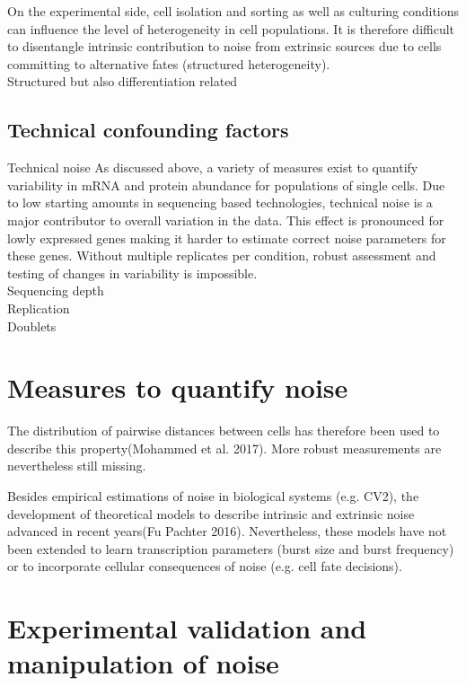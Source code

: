 On the experimental side, cell isolation and sorting as well as culturing conditions can influence the level of heterogeneity in cell populations. It is therefore difficult to disentangle intrinsic contribution to noise from extrinsic sources due to cells committing to alternative fates (structured heterogeneity).  \\

Structured but also differentiation related

\subsection{Technical confounding factors}

Technical noise
As discussed above, a variety of measures exist to quantify variability in mRNA and protein abundance for populations of single cells. Due to low starting amounts in sequencing based technologies, technical noise is a major contributor to overall variation in the data. This effect is pronounced for lowly expressed genes making it harder to estimate correct noise parameters for these genes. Without multiple replicates per condition, robust assessment and testing of changes in variability is impossible.\\

Sequencing depth\\
Replication\\
Doublets

\section{Measures to quantify noise}

 The distribution of pairwise distances between cells has therefore been used to describe this property(Mohammed et al. 2017). More robust measurements are nevertheless still missing.
 
 Besides empirical estimations of noise in biological systems (e.g. CV2), the development of theoretical models to describe intrinsic and extrinsic noise advanced in recent years(Fu Pachter 2016). Nevertheless, these models have not been extended to learn transcription parameters (burst size and burst frequency) or to incorporate cellular consequences of noise (e.g. cell fate decisions).

\section{Experimental validation and manipulation of noise}

